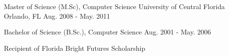 

\begin{cventries}

  \cventry
    {Master of Science (M.Sc), Computer Science} %
    {University of Central Florida} %
    {Orlando, FL} %
    {Aug. 2008 - May. 2011} %
    {
    }

  \cventry
    {Bachelor of Science (B.Sc.), Computer Science} %
    {} %
    {} %
    {Aug. 2001 - May. 2006} %
    {
	\begin{cvitems}
		\item {Recipient of Florida Bright Futures Scholarship}
	\end{cvitems}
    }

\end{cventries}
